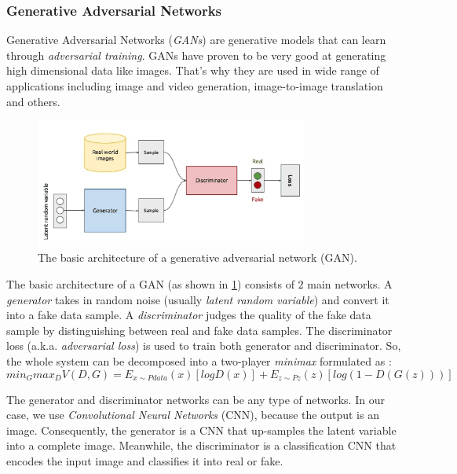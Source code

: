 \subsubsection{Generative Adversarial Networks}
Generative Adversarial Networks (\emph{GANs}) \cite{goodfellow2014generative} are generative models that can learn through \emph{adversarial training}. GANs have proven to be very good at generating high dimensional data like images. That's why they are used in wide range of applications including image and video generation, image-to-image translation and others.

\begin{figure}[H]
    \centering
    \includegraphics[width=0.8\textwidth]{images/gan-arch.png}
    \caption{The basic architecture of a generative adversarial network (GAN).}
    \label{fig:gan}
\end{figure}

The basic architecture of a GAN (as shown in \ref{fig:gan}) consists of $2$ main networks. A \emph{generator} takes in random noise (usually \emph{latent random variable}) and convert it into a fake data sample. A \emph{discriminator} judges the quality of the fake data sample by distinguishing between real and fake data samples. The discriminator loss (a.k.a. \emph{adversarial loss}) is used to train both generator and discriminator. So, the whole system can be decomposed into a two-player \emph{minimax} formulated as :
\begin{equation}
    min_{G} max_{D} V(D, G) = E_{x \sim Pdata}(x) [log D(x)] + E_{z \sim Pz}(z)[log(1 - D(G(z)))]
\end{equation}

The generator and discriminator networks can be any type of networks. In our case, we use \emph{Convolutional Neural Networks} (CNN), because the output is an image. Consequently, the generator is a CNN that up-samples the latent variable into a complete image. Meanwhile, the discriminator is a classification CNN that encodes the input image and classifies it into real or fake.

